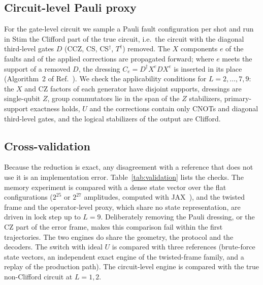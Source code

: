 \documentclass[a4paper]{article}
\begin{document}
\subsection{Circuit-level Pauli proxy}
\label{sec:circ}

For the gate-level circuit we sample a Pauli fault configuration per shot and run in Stim the Clifford part of the true circuit, i.e.\ the circuit with the diagonal third-level gates $D$ (CCZ, CS, CS$^\dagger$, $T^\dagger$) removed. The $X$ components $e$ of the faults and of the applied corrections are propagated forward; where $e$ meets the support of a removed $D$, the dressing $C_e=D^\dagger X^eDX^e$ is inserted in its place (Algorithm~2 of Ref.~\cite{takada2026exact}). We check the applicability conditions for $L=2,\dots,7,9$: the $X$ and CZ factors of each generator have disjoint supports, dressings are single-qubit $Z$, group commutators lie in the span of the $Z$ stabilizers, primary-support exactness holds, $U$ and the corrections contain only CNOTs and diagonal third-level gates, and the logical stabilizers of the output are Clifford.

\subsection{Cross-validation}

Because the reduction is exact, any disagreement with a reference that does not use it is an implementation error. Table~\ref{tab:validation} lists the checks. The memory experiment is compared with a dense state vector over the flat configurations ($2^{25}$ or $2^{27}$ amplitudes, computed with JAX~\cite{jax2018github}), and the twisted frame and the operator-level proxy, which share no state representation, are driven in lock step up to $L=9$. Deliberately removing the Pauli dressing, or the CZ part of the error frame, makes this comparison fail within the first trajectories. The two engines do share the geometry, the protocol and the decoders. The switch with ideal $U$ is compared with three references (brute-force state vectors, an independent exact engine of the twisted-frame family, and a replay of the production path). The circuit-level engine is compared with the true non-Clifford circuit at $L=1,2$.
\end{document}
